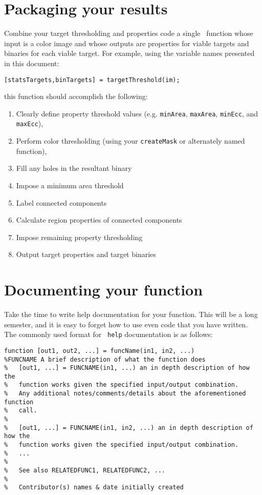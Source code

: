 \documentclass{tufte-handout}
\begin{document}
\section{Packaging your results}
Combine your target thresholding and properties code a single \Matlab\ function whose input is a color image and whose outputs are properties for viable targets and binaries for each viable target. For example, using the variable names presented in this document:
\begin{lstlisting}[style=usnaMatlab]
[statsTargets,binTargets] = targetThreshold(im);
\end{lstlisting}
this function should accomplish the following:
\begin{enumerate}
\item Clearly define property threshold values (e.g. \lstinline{minArea}, \lstinline{maxArea}, \lstinline{minEcc}, and \lstinline{maxEcc}),
\item Perform color thresholding (using your \lstinline{createMask} or alternately named function),
\item Fill any holes in the resultant binary
\item Impose a minimum area threshold
\item Label connected components
\item Calculate region properties of connected components
\item Impose remaining property thresholding
\item Output target properties and target binaries
\end{enumerate}

\section{Documenting your function}
Take the time to write help documentation for your function. This will be a long semester, and it is easy to forget how to use even code that you have written. The commonly used format for \Matlab\ \lstinline{help} documentation is as follows:
\begin{lstlisting}[style=usnaMatlab]
function [out1, out2, ...] = funcName(in1, in2, ...)
%FUNCNAME A brief description of what the function does
%	[out1, ...] = FUNCNAME(in1, ...) an in depth description of how the 
%	function works given the specified input/output combination.
%	Any additional notes/comments/details about the aforementioned function 
%	call.
%
%	[out1, ...] = FUNCNAME(in1, in2, ...) an in depth description of how the 
%	function works given the specified input/output combination.
%	...
%
% 	See also RELATEDFUNC1, RELATEDFUNC2, ...
%
%	Contributor(s) names & date initially created
\end{lstlisting}
\end{document}
